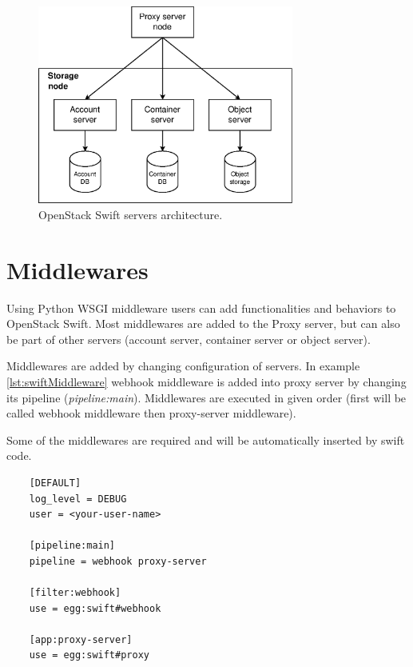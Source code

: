     \begin{figure}[hbt]
        \centering
        \includegraphics[width=0.75\textwidth]{obrazky-figures/swift-servers.eps}
        \caption{OpenStack Swift servers architecture.}
        \label{fig:swiftServers}
    \end{figure}

    \section{Middlewares}
    Using Python WSGI middleware users can add functionalities and behaviors to OpenStack Swift. Most middlewares are added to the Proxy server, but can also be part of other servers (account server, container server or object server).

    Middlewares are added by changing configuration of servers. In example \ref{lst:swiftMiddleware}
    webhook middleware is added into proxy server by changing its pipeline (\textit{pipeline:main}). Middlewares are executed in given order (first will be called webhook middleware then proxy-server middleware).

    Some of the middlewares are required and will be automatically inserted by swift code\cite{swiftMiddleware}.

    \lstset{
        caption=Example of proxy server configuration (proxy-server.conf),
        label=lst:swiftMiddleware
    }
    \begin{lstlisting}
    [DEFAULT]
    log_level = DEBUG
    user = <your-user-name>

    [pipeline:main]
    pipeline = webhook proxy-server

    [filter:webhook]
    use = egg:swift#webhook

    [app:proxy-server]
    use = egg:swift#proxy
    \end{lstlisting}

